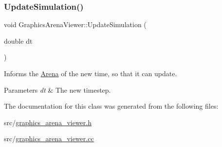 \subsubsection{\texorpdfstring{Update\+Simulation()}{UpdateSimulation()}}
{\footnotesize\ttfamily void Graphics\+Arena\+Viewer\+::\+Update\+Simulation (\begin{DoxyParamCaption}\item[{double}]{dt }\end{DoxyParamCaption})\hspace{0.3cm}{\ttfamily [override]}}



Informs the \mbox{\hyperlink{class_arena}{Arena}} of the new time, so that it can update. 


\begin{DoxyParams}{Parameters}
{\em dt} & The new timestep. \\
\hline
\end{DoxyParams}


The documentation for this class was generated from the following files\+:\begin{DoxyCompactItemize}
\item 
src/\mbox{\hyperlink{graphics__arena__viewer_8h}{graphics\+\_\+arena\+\_\+viewer.\+h}}\item 
src/\mbox{\hyperlink{graphics__arena__viewer_8cc}{graphics\+\_\+arena\+\_\+viewer.\+cc}}\end{DoxyCompactItemize}
